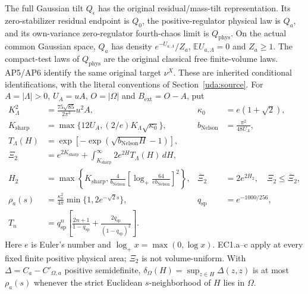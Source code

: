 \documentclass[11pt]{article}
\theoremstyle{plain}
\theoremstyle{definition}
\theoremstyle{remark}
\newcommand{\E}{\mathbb{E}}
\begin{document}
The full Gaussian tilt $Q_\epsilon$ has the original residual/mass-tilt
representation. Its zero-stabilizer residual endpoint is $Q_0$, the
positive-regulator physical law is $Q_a$, and its own-variance
zero-regulator fourth-chaos limit is $Q_{\mathrm{phys}}$. On the actual
common Gaussian space, $Q_a$ has density $e^{-U_{a,\Lambda}}/Z_a$,
$\E U_{a,\Lambda}=0$ and $Z_a\ge1$. The compact-test laws of
$Q_{\mathrm{phys}}$ are the original classical free finite-volume laws.
AP5/AP6 identify the same original target $\nu^X$. These are inherited
conditional identifications, with the literal conventions of
Section~\ref{uda:source}. For $A=|\Lambda|>0$, $U_A=uA$,
$O=|\Omega|$ and $B_{\mathrm{ext}}=O-A$, put
\begin{align*}
 K_\Lambda^2&=\frac{75\sqrt{85}}{2\pi^3}u^2 A,&
 \kappa_0&=e(1+\sqrt2),\\
 K_{\mathrm{sharp}}&=\max\{12U_A,(2/e)K_\Lambda\sqrt{\kappa_0}\},&
 b_{\mathrm{Nelson}}&=\frac{\pi^2}{48U_A},\\
 T_\Lambda(H)&=\exp[-\exp(\sqrt{b_{\mathrm{Nelson}}H}-1)],\\
 \Xi_2&=e^{2K_{\mathrm{sharp}}}
       +\int_{K_{\mathrm{sharp}}}^\infty2e^{2H}T_\Lambda(H)\,dH,\\
 H_2&=\max\left\{K_{\mathrm{sharp}},
 \frac4{b_{\mathrm{Nelson}}}
 \left[\log_+\frac{64}{e b_{\mathrm{Nelson}}}\right]^2\right\},&
 \overline\Xi_2&=2e^{2H_2},\quad\Xi_2\le\overline\Xi_2,\\
 \rho_a(s)&=\frac{\kappa_a^2}{4\pi}\min\{1,2e^{-\sqrt2s}\},&
 q_{\mathrm{sp}}&=e^{-1000/256},\\
 T_n&=q_{\mathrm{sp}}^n\left[\frac{2n+1}{1-q_{\mathrm{sp}}}
               +\frac{2q_{\mathrm{sp}}}{(1-q_{\mathrm{sp}})^2}\right].
\end{align*}
Here $e$ is Euler's number and $\log_+x=\max(0,\log x)$.
EC1.a--c apply at every fixed finite positive physical area; $\Xi_2$ is
not volume-uniform. With $\Delta=C_a-C'_{\Omega,a}$ positive semidefinite,
$\delta_\Omega(H)=\sup_{z\in H}\Delta(z,z)$ is at most $\rho_a(s)$
whenever the strict Euclidean $s$-neighborhood of $H$ lies in $\Omega$.
\end{document}

